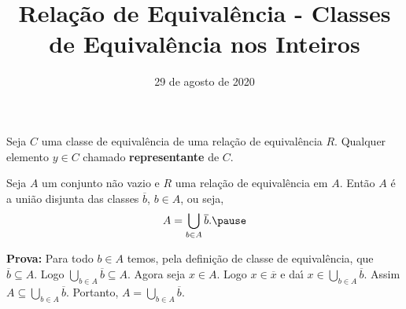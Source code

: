 \documentclass{beamer}
\title{Rela\c{c}\~ao de Equival\^encia - Classes de Equival\^encia nos Inteiros}
\author[\autor]{\autor}
\institute[\instituto]{\instituto}
\date{29 de agosto de 2020}
\begin{document}
    \begin{frame}
        \maketitle
    \end{frame}


    \begin{frame}
        \begin{definicao}
            Seja $C$ uma classe de equival{\^e}ncia \pause de uma rela{\c c}{\~a}o de equival{\^e}ncia $R$. \pause Qualquer elemento $y\in C$  chamado \textbf{representante} de $C$.\pause
        \end{definicao}

        \begin{proposicao}
            Seja $A$ um conjunto n{\~a}o vazio \pause e $R$ uma rela{\c c}{\~a}o de equival{\^e}ncia em $A$. \pause Ent{\~a}o $A$ {\'e} a uni{\~a}o disjunta das classes $\overline{b}$, $b \in A$, ou seja,\pause
            \[
                A = \bigcup_{b\in A}\overline{b}.\pause
            \]
        \end{proposicao}
        \noindent\textbf{Prova:}
            Para todo $b\in A$ temos, \pause pela defini\c{c}\~ao de classe de equival\^encia, que $\overline{b}\subseteq A$. \pause Logo $\bigcup_{b\in A}\overline{b}\subseteq A$. \pause Agora seja $x\in A$. \pause Logo $x \in \overline{x}$ \pause e da{\'\i} $x\in \bigcup_{b\in A}\overline{b}$. \pause Assim $A\subseteq\bigcup_{b\in A}\overline{b}$. \pause Portanto, $A=\bigcup_{b\in A}\overline{b}$.\hspace{.5cm}\qedsymbol\pause
    \end{frame}

    \begin{frame}
        
    \end{frame}
\end{document}
